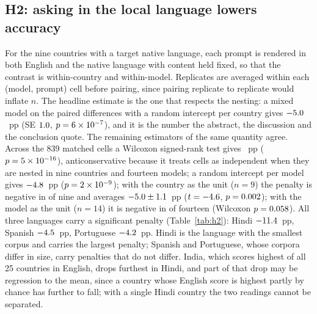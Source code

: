 \begin{table}[h]
\centering
\caption{Composite accuracy by task type (25 countries; T1 on 24, Egypt having
no key). On T1, T2 and T3 the factual-accuracy subcomponent is the code verdict
where the returned value is checkable against the official register, and the
remaining subcomponents are judge-scored; T4 is panel-scored; T5 retains the
collection judge's scores.}
\label{tab:conf-task}
\footnotesize
\setlength{\tabcolsep}{8pt}
\renewcommand{\arraystretch}{1.15}

\end{table}

\subsection{H2: asking in the local language lowers accuracy}
\label{sec:results:h2}

For the nine countries with a target native language, each prompt is rendered
in both English and the native language with content held fixed, so that the
contrast is within-country and within-model. Replicates are averaged within
each (model, prompt) cell before pairing, since pairing replicate to replicate
would inflate $n$. The headline estimate is the one that respects the
nesting: a mixed model on the paired differences with a random intercept per
country gives $-5.0$~pp (SE $1.0$,
$p=6\times10^{-7}$), and it is the number the abstract, the discussion and
the conclusion quote. The remaining estimators of the same quantity agree.
Across the 839 matched cells a Wilcoxon signed-rank test gives \nnativa{}~pp
($p=5\times10^{-16}$), anticonservative because it treats cells as independent when
they are nested in nine countries and fourteen models; a random intercept per
model gives $-4.8$~pp ($p=2\times10^{-9}$); with the country as the
unit ($n=9$) the penalty is negative in \nhtwocneg{} of nine and averages
$-5.0\pm1.1$~pp ($t=-4.6$, $p=0.002$); with the model as
the unit ($n=14$) it is negative in \nhtwomneg{} of fourteen (Wilcoxon
$p=0.058$). All three languages carry a significant penalty
(Table~\ref{tab:h2}): Hindi $-11.4$~pp, Spanish $-4.5$~pp,
Portuguese $-4.2$~pp. Hindi is the language with the smallest corpus and
carries the largest penalty; Spanish and Portuguese, whose corpora differ in
size, carry penalties that do not differ. India, which scores highest of all 25
countries in English, drops furthest in Hindi, and part of that drop may be
regression to the mean, since a country whose English score is highest partly
by chance has further to fall; with a single Hindi country the two readings
cannot be separated.

